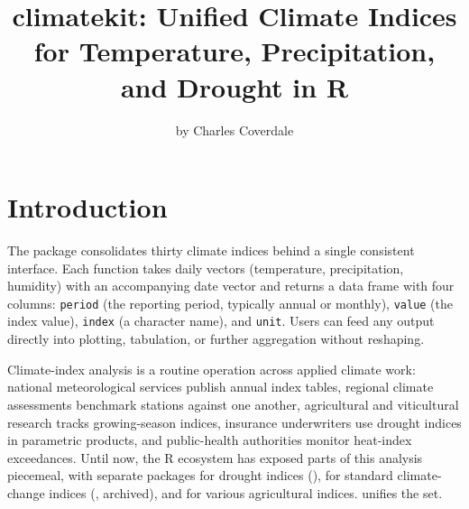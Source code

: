 \title{climatekit: Unified Climate Indices for Temperature, Precipitation, and Drought in R}


\author{by Charles Coverdale}

\maketitle


\section{Introduction}\label{introduction}

The  package consolidates thirty climate
indices behind a single consistent interface. Each function takes
daily vectors (temperature, precipitation, humidity) with an
accompanying date vector and returns a data frame with four
columns: \texttt{period} (the reporting period, typically annual or
monthly), \texttt{value} (the index value), \texttt{index} (a character name),
and \texttt{unit}. Users can feed any output directly into plotting,
tabulation, or further aggregation without reshaping.

Climate-index analysis is a routine operation across applied
climate work: national meteorological services publish annual
index tables, regional climate assessments benchmark stations
against one another, agricultural and viticultural research tracks
growing-season indices, insurance underwriters use drought indices
in parametric products, and public-health authorities monitor
heat-index exceedances. Until now, the R ecosystem has exposed
parts of this analysis piecemeal, with separate packages for
drought indices (), for standard climate-change
indices (, archived), and for various
agricultural indices.  unifies the set.

